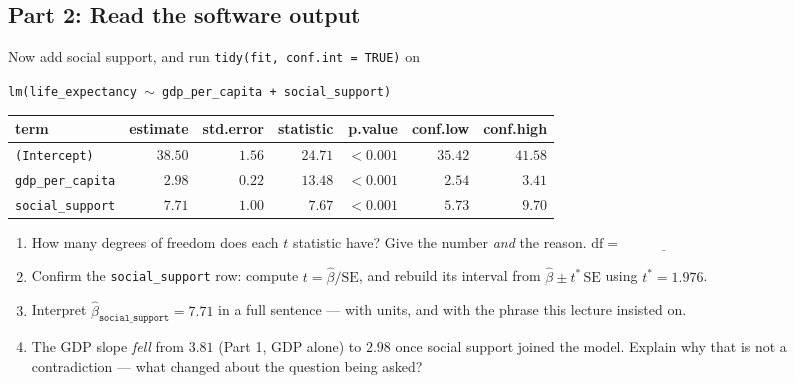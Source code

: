 \documentclass{article}
\newcommand{\blankline}[1]{\underline{\hspace{#1}}}
\begin{document}
\subsection*{Part 2: Read the software output}

Now add social support, and run \texttt{tidy(fit, conf.int = TRUE)} on

\begin{center}
\texttt{lm(life\_expectancy $\sim$ gdp\_per\_capita + social\_support)}
\end{center}

\begin{center}
\renewcommand{\arraystretch}{1.3}
\begin{tabular}{lrrrrrr}
\toprule
term & estimate & std.error & statistic & p.value & conf.low & conf.high \\
\midrule
\texttt{(Intercept)}     & $38.50$ & $1.56$ & $24.71$ & $<0.001$ & $35.42$ & $41.58$ \\
\texttt{gdp\_per\_capita} & $2.98$  & $0.22$ & $13.48$ & $<0.001$ & $2.54$  & $3.41$ \\
\texttt{social\_support}  & $7.71$  & $1.00$ & $7.67$  & $<0.001$ & $5.73$  & $9.70$ \\
\bottomrule
\end{tabular}
\end{center}

\begin{enumerate}[label={\bfseries (\Alph*)},itemsep=.8em]
\item How many degrees of freedom does each $t$ statistic have? Give the number \emph{and} the reason. \hfill $\mathrm{df} = \blankline{1in}$ \\[1.5em]
\item Confirm the \texttt{social\_support} row: compute $t = \hat\beta / \mathrm{SE}$, and rebuild its interval from $\hat\beta \pm t^\ast\,\mathrm{SE}$ using $t^\ast = 1.976$. \\[3.5em]
\item Interpret $\hat\beta_{\texttt{social\_support}} = 7.71$ in a full sentence --- with units, and with the phrase this lecture insisted on. \\[3.5em]
\item The GDP slope \emph{fell} from $3.81$ (Part 1, GDP alone) to $2.98$ once social support joined the model. Explain why that is not a contradiction --- what changed about the question being asked? \\[4em]
\end{enumerate}
\end{document}
